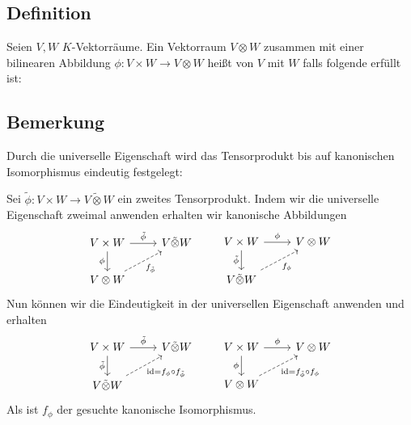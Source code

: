 \subsection[Definition Tensorprodukt]{Definition} %
\label{sub:102}
Seien $V,W$ $K$-Vektorräume. Ein Vektorraum $V \otimes W$ zusammen mit einer bilinearen Abbildung $\phi : V \times W \to V \otimes W$ heißt  von
$V$ mit $W$ falls folgende  erfüllt ist: 
\begin{figure}[h]
\end{figure} 

\subsection[Bemerkung zur Eindeutigkeit des Tensorprodukts]{Bemerkung} %
\label{sub:103}
Durch die universelle Eigenschaft wird das Tensorprodukt bis auf kanonischen Isomorphismus eindeutig festgelegt:

Sei $\tilde \phi : V \times W \to V \tilde\otimes W$ ein zweites Tensorprodukt. Indem wir die universelle Eigenschaft zweimal anwenden erhalten wir kanonische Abbildungen
\[
	\begin{tikzcd}
			V  \times W \rar{\tilde \phi} \dar[swap]{\phi} & V \tilde\otimes W \\
			V \otimes W \urar[swap, dashed]{f_{\tilde \phi}}
		\end{tikzcd} 
		\qquad 
		\begin{tikzcd}
		V  \times W \rar{\phi} \dar[swap]{\tilde\phi} & V \otimes W \\
		V \tilde\otimes W \urar[swap, dashed]{f_\phi}
	\end{tikzcd}
\]
Nun können wir die Eindeutigkeit in der universellen Eigenschaft anwenden und erhalten
\[
	\begin{tikzcd}
			V  \times W \rar{\tilde \phi} \dar[swap]{\tilde\phi} & V \tilde\otimes W \\
			V \tilde\otimes W \urar[swap, dashed]{\id = f_\phi \circ f_{\tilde \phi}}
		\end{tikzcd} 
		\qquad 
		\begin{tikzcd}
		V  \times W \rar{\phi} \dar[swap]{\phi} & V \otimes W \\
		V \otimes W \urar[swap, dashed]{\id = f_{\tilde \phi} \circ f_\phi}
	\end{tikzcd} 
\]
Als ist $f_\phi$ der gesuchte kanonische Isomorphismus. \bewende

